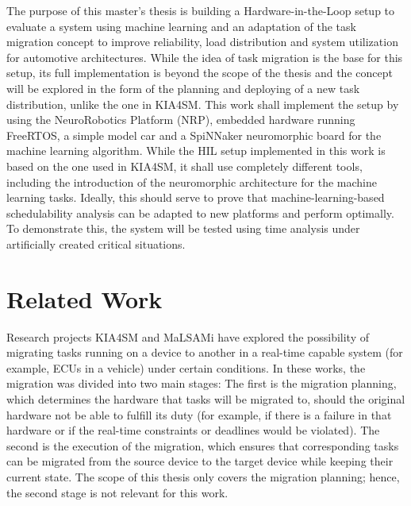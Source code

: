 The purpose of this master’s thesis is building a Hardware-in-the-Loop setup to evaluate a system using machine learning and an adaptation of the task migration concept to improve reliability, load distribution and system utilization for automotive architectures. While the idea of task migration is the base for this setup, its full implementation is beyond the scope of the thesis and the concept will be explored in the form of the planning and deploying of a new task distribution, unlike the one in KIA4SM. This work shall implement the setup by using the NeuroRobotics Platform (NRP), embedded hardware running FreeRTOS, a simple model car and a SpiNNaker neuromorphic board for the machine learning algorithm. While the HIL setup implemented in this work is based on the one used in KIA4SM, it shall use completely different tools, including the introduction of the neuromorphic architecture for the machine learning tasks. Ideally, this should serve to prove that machine-learning-based schedulability analysis can be adapted to new platforms and perform optimally. To demonstrate this, the system will be tested using time analysis under artificially created critical situations.

\chapter{Related Work}\label{chapter:relatedwork}
Research projects KIA4SM and MaLSAMi have explored the possibility of migrating tasks running on a device to another in a real-time capable system (for example, ECUs in a vehicle) under certain conditions. In these works, the migration was divided into two main stages: The first is the migration planning, which determines the hardware that tasks will be migrated to, should the original hardware not be able to fulfill its duty (for example, if there is a failure in that hardware or if the real-time constraints or deadlines would be violated). The second is the execution of the migration, which ensures that corresponding tasks can be migrated from the source device to the target device while keeping their current state. The scope of this thesis only covers the migration planning; hence, the second stage is not relevant for this work.

